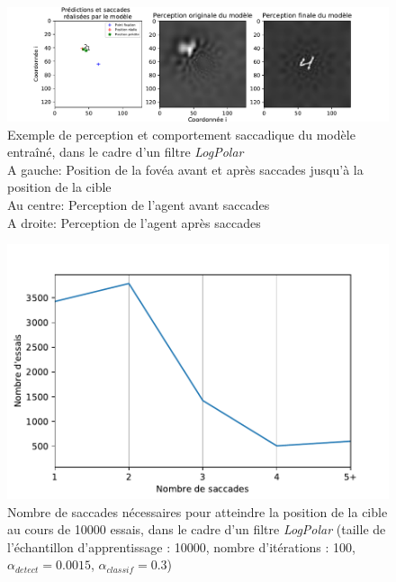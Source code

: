 \begin{figure}[th]
\centering
\includegraphics[scale=0.75]{Figures/saccades_logpolar}
\decoRule
\caption[Figure]{Exemple de perception et comportement saccadique du modèle entraîné, dans le cadre d'un filtre \textit{LogPolar}
\\ A gauche: Position de la fovéa avant et après saccades jusqu'à la position de la cible
\\ Au centre: Perception de l'agent avant saccades
\\ A droite: Perception de l'agent après saccades}
\label{fig:saccades_logpolar}
\end{figure}

\begin{figure}[th]
\centering
\includegraphics{Figures/logpolar_sacc_nombre}
\decoRule
\caption[Figure]{Nombre de saccades nécessaires pour atteindre la position de la cible au cours de 10000 essais, dans le cadre d'un filtre \textit{LogPolar} (taille de l'échantillon d'apprentissage :  10000, nombre d'itérations : 100, $\alpha_{detect}=0.0015$, $\alpha_{classif}=0.3$)}
\label{fig:sacc_nombre}
\end{figure}

